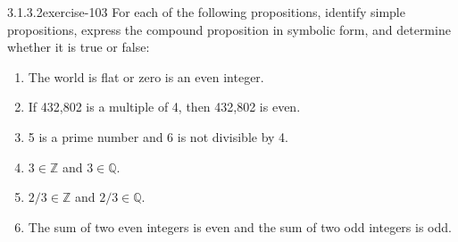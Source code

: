 \documentclass[twoside,10pt,]{book}
\numberwithin{equation}{section}
\begin{document}
\begin{divisionsolution}{3.1.3.2}{}{exercise-103}%
\hypertarget{p-911}{}%
For each of the following propositions, identify simple propositions, express the compound proposition in symbolic form, and determine whether it is true or false:%
\par
\hypertarget{p-912}{}%
\leavevmode%
\begin{enumerate}[label=(\alph*)]
\item\hypertarget{li-501}{}\hypertarget{p-913}{}%
The world is flat or zero is an even integer.%
\item\hypertarget{li-502}{}\hypertarget{p-914}{}%
If 432,802 is a multiple of 4, then 432,802 is even.%
\item\hypertarget{li-503}{}\hypertarget{p-915}{}%
5 is a prime number and 6 is not divisible by 4.%
\item\hypertarget{li-504}{}\hypertarget{p-916}{}%
\(3 \in \mathbb{Z}\) and \(3 \in  \mathbb{Q}\).%
\item\hypertarget{li-505}{}\hypertarget{p-917}{}%
\(2/3 \in  \mathbb{Z}\) and \(2/3 \in  \mathbb{Q}\).%
\item\hypertarget{li-506}{}\hypertarget{p-918}{}%
The sum of two even integers is even and the sum of two odd integers is odd.%
\end{enumerate}
%
\end{divisionsolution}%
\end{document}
